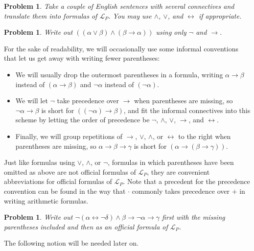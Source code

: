 \documentclass[12pt]{amsbook}
\newcommand{\fromto}{\leftrightarrow}
\theoremstyle{plain}
\newtheorem{prob}[thm]{Problem}
\theoremstyle{definition}
\theoremstyle{remark}
\begin{document}
\begin{prob} \label{p:one8}
Take a couple of English sentences with several connectives and translate them into formulas of $\mathcal{L}_P$.  You may use $\land$,  $\lor$,  and $\fromto$ if appropriate.
\end{prob}

\begin{prob} \label{p:one9}
Write out $((\alpha \lor \beta) \land (\beta \to \alpha))$ using only $\lnot$ and $\to$.
\end{prob}

For the sake of readability,  we will occasionally use some informal conventions that let us get away with writing fewer parentheses:
\begin{itemize}
\item  We will usually drop the outermost parentheses in a formula,  writing $\alpha \to \beta$ instead of $(\alpha \to \beta)$ and $\lnot \alpha$ instead of $(\lnot \alpha)$.  
\item We will let $\lnot$ take precedence over $\to$ when parentheses are missing,  so $\lnot \alpha \to \beta$ is short for $((\lnot\alpha) \to \beta)$,  and fit the informal connectives into this scheme by letting the order of precedence be $\lnot$,  $\land$,  $\lor$,  $\to$,  and $\fromto$.
\item Finally,  we will group repetitions of $\to$,  $\lor$,  $\land$,  or $\fromto$  to the right when parentheses are missing,  so  $\alpha \to \beta \to \gamma$ is short for $(\alpha \to (\beta \to \gamma))$.  
\end{itemize}
Just like formulas using $\lor$,  $\land$,  or $\lnot$,  formulas in which parentheses have been omitted as above are not official formulas of $\mathcal{L}_P$,  they are convenient abbreviations for official formulas of $\mathcal{L}_P$.  Note that a precedent for the precedence convention can be found in the way that $\cdot$ commonly takes precedence over $+$ in writing arithmetic formulas.

\begin{prob} \label{p:one10}
Write out $\lnot (\alpha \fromto \lnot \delta ) \land \beta \to \lnot \alpha \to \gamma$ first with the missing parentheses included and then as an official formula of $\mathcal{L}_P$.
\end{prob}

The following notion will be needed later on.
\end{document}
